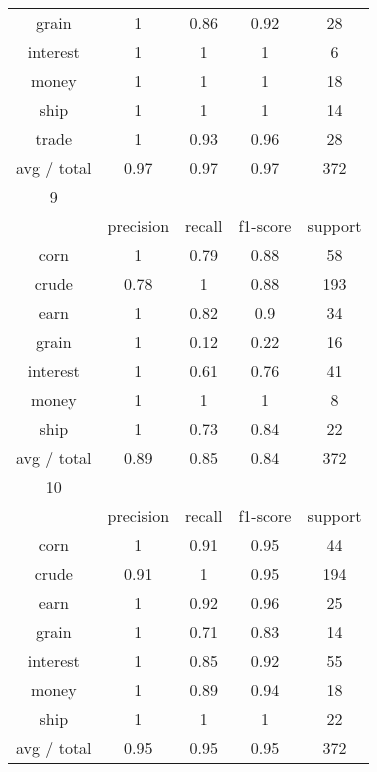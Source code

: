 \documentclass[11pt]{article}
\begin{document}
\begin{center}
\begin{longtable}{| c | c | c | c | c |}
grain         & 1         & 0.86   & 0.92     & 28      \\
interest      & 1         & 1      & 1        & 6       \\
money         & 1         & 1      & 1        & 18      \\
ship          & 1         & 1      & 1        & 14      \\
trade         & 1         & 0.93   & 0.96     & 28      \\
 avg / total   & 0.97      & 0.97   & 0.97     & 372     \\
 \hline
9            &           &        &          &         \\
\hline
             & precision & recall & f1-score & support \\
 corn          & 1         & 0.79   & 0.88     & 58      \\
crude         & 0.78      & 1      & 0.88     & 193     \\
earn          & 1         & 0.82   & 0.9      & 34      \\
grain         & 1         & 0.12   & 0.22     & 16      \\
interest      & 1         & 0.61   & 0.76     & 41      \\
money         & 1         & 1      & 1        & 8       \\
ship          & 1         & 0.73   & 0.84     & 22      \\
 avg / total   & 0.89      & 0.85   & 0.84     & 372     \\
 \hline
10            &           &        &          &         \\
\hline
             & precision & recall & f1-score & support \\
 corn          & 1         & 0.91   & 0.95     & 44      \\
crude         & 0.91      & 1      & 0.95     & 194     \\
earn          & 1         & 0.92   & 0.96     & 25      \\
grain         & 1         & 0.71   & 0.83     & 14      \\
interest      & 1         & 0.85   & 0.92     & 55      \\
money         & 1         & 0.89   & 0.94     & 18      \\
ship          & 1         & 1      & 1        & 22      \\
 avg / total   & 0.95      & 0.95   & 0.95     & 372     \\
 \hline
\end{longtable}
\end{center}
\end{document}
